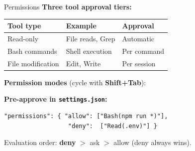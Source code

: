 \documentclass[aspectratio=169]{beamer}
\begin{document}
\begin{frame}[fragile]{Permissions}
\textbf{Three tool approval tiers:}
\begin{table}
\centering\small
\begin{tabular}{lll}
\toprule
\textbf{Tool type} & \textbf{Example} & \textbf{Approval} \\
\midrule
Read-only & File reads, Grep & Automatic \\
Bash commands & Shell execution & Per command \\
File modification & Edit, Write & Per session \\
\bottomrule
\end{tabular}
\end{table}

\textbf{Permission modes} (cycle with \textbf{Shift+Tab}):
\begin{center}
\end{center}

\smallskip
\textbf{Pre-approve in \texttt{settings.json}:}
\begin{lstlisting}
"permissions": { "allow": ["Bash(npm run *)"],
                  "deny":  ["Read(.env)"] }
\end{lstlisting}
\vspace{-0.3em}
\footnotesize Evaluation order: \textbf{deny} $>$ ask $>$ allow (deny always wins).
\end{frame}
\end{document}

